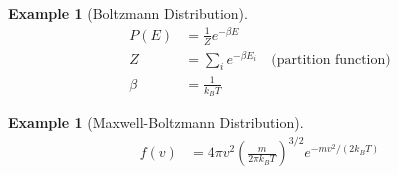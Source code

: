 \documentclass{article}
\newtheorem{example}[theorem]{Example}
\begin{document}
\begin{example}[Boltzmann Distribution]
\begin{align*}
    P(E) &= \frac{1}{Z}e^{-\beta E} \\
    Z &= \sum_i e^{-\beta E_i} \quad \text{(partition function)} \\
    \beta &= \frac{1}{k_B T}
\end{align*}
\end{example}

\begin{example}[Maxwell-Boltzmann Distribution]
\begin{align*}
    f(v) &= 4\pi v^2\left(\frac{m}{2\pi k_B T}\right)^{3/2}e^{-mv^2/(2k_B T)}
\end{align*}
\end{example}
\end{document}
